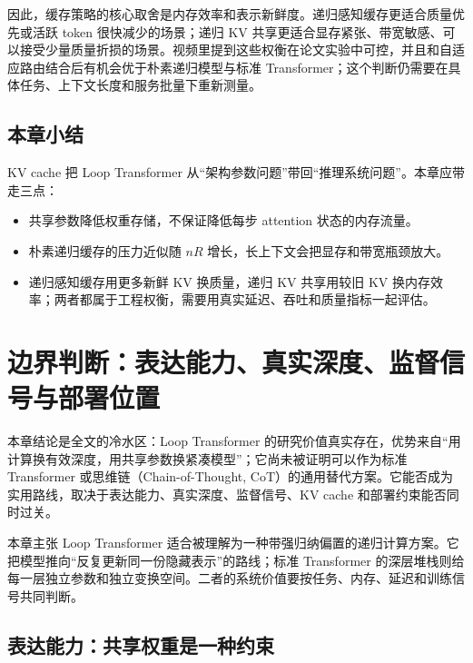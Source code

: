 ﻿\documentclass[a4paper]{article}
\begin{document}
因此，缓存策略的核心取舍是内存效率和表示新鲜度。递归感知缓存更适合质量优先或活跃 token 很快减少的场景；递归 KV 共享更适合显存紧张、带宽敏感、可以接受少量质量折损的场景。视频里提到这些权衡在论文实验中可控，并且和自适应路由结合后有机会优于朴素递归模型与标准 Transformer；这个判断仍需要在具体任务、上下文长度和服务批量下重新测量。

\subsection{本章小结}

KV cache 把 Loop Transformer 从“架构参数问题”带回“推理系统问题”。本章应带走三点：

\begin{itemize}
  \item 共享参数降低权重存储，不保证降低每步 attention 状态的内存流量。
  \item 朴素递归缓存的压力近似随 \(nR\) 增长，长上下文会把显存和带宽瓶颈放大。
  \item 递归感知缓存用更多新鲜 KV 换质量，递归 KV 共享用较旧 KV 换内存效率；两者都属于工程权衡，需要用真实延迟、吞吐和质量指标一起评估。
\end{itemize}


\section{边界判断：表达能力、真实深度、监督信号与部署位置}
\label{sec:limits-deployment}

本章结论是全文的冷水区：Loop Transformer 的研究价值真实存在，优势来自“用计算换有效深度，用共享参数换紧凑模型”；它尚未被证明可以作为标准 Transformer 或思维链（Chain-of-Thought, CoT）的通用替代方案。它能否成为实用路线，取决于表达能力、真实深度、监督信号、KV cache 和部署约束能否同时过关。

\begin{importantbox}{本章主张}
Loop Transformer 适合被理解为一种带强归纳偏置的递归计算方案。它把模型推向“反复更新同一份隐藏表示”的路线；标准 Transformer 的深层堆栈则给每一层独立参数和独立变换空间。二者的系统价值要按任务、内存、延迟和训练信号共同判断。
\end{importantbox}

\subsection{表达能力：共享权重是一种约束}
\end{document}
